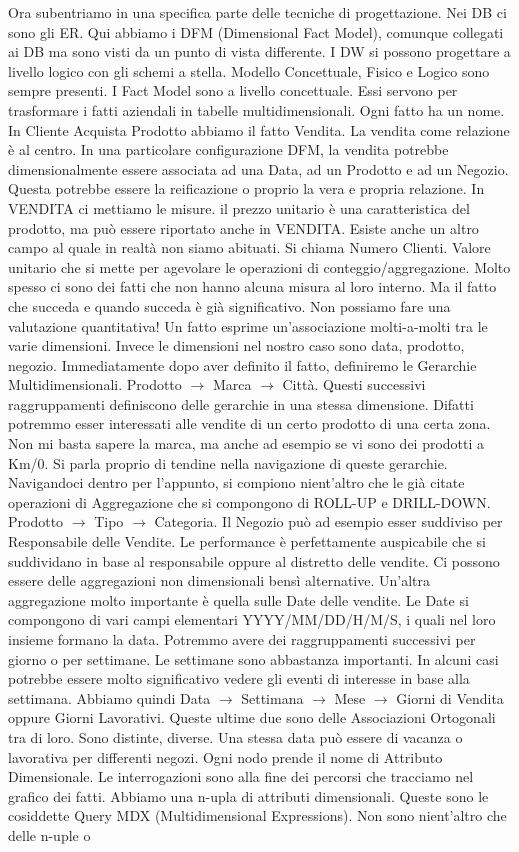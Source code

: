 Ora subentriamo in una specifica parte delle tecniche di progettazione. Nei DB ci sono gli ER. Qui abbiamo i DFM (Dimensional Fact Model), comunque collegati ai DB ma sono visti da un punto di vista differente. I DW si possono progettare a livello logico con gli schemi a stella. Modello Concettuale, Fisico e Logico sono sempre presenti. I Fact Model sono a livello concettuale. Essi servono per trasformare i fatti aziendali in tabelle multidimensionali. Ogni fatto ha un nome. In Cliente Acquista Prodotto abbiamo il fatto Vendita. La vendita come relazione è al centro. In una particolare configurazione DFM, la vendita potrebbe dimensionalmente essere associata ad una Data, ad un Prodotto e ad un Negozio. Questa potrebbe essere la reificazione o proprio la vera e propria relazione. In VENDITA ci mettiamo le misure. il prezzo unitario è una caratteristica del prodotto, ma può essere riportato anche in VENDITA. Esiste anche un altro campo al quale in realtà non siamo abituati. Si chiama Numero Clienti. Valore unitario che si mette per agevolare le operazioni di conteggio/aggregazione. Molto spesso ci sono dei fatti che non hanno alcuna misura al loro interno. Ma il fatto che succeda e quando succeda è già significativo. Non possiamo fare una valutazione quantitativa! Un fatto esprime un'associazione molti-a-molti tra le varie dimensioni. Invece le dimensioni nel nostro caso sono {{data}, {prodotto}, {negozio}}. Immediatamente dopo aver definito il fatto, definiremo le Gerarchie Multidimensionali. Prodotto $\rightarrow$ Marca $\rightarrow$ Città. Questi successivi raggruppamenti definiscono delle gerarchie in una stessa dimensione. Difatti potremmo esser interessati alle vendite di un certo prodotto di una certa zona. Non mi basta sapere la marca, ma anche ad esempio se vi sono dei prodotti a Km/0. Si parla proprio di tendine nella navigazione di queste gerarchie. Navigandoci dentro per l'appunto, si compiono nient'altro che le già citate operazioni di Aggregazione che si compongono di ROLL-UP e DRILL-DOWN. Prodotto $\rightarrow$ Tipo $\rightarrow$ Categoria. Il Negozio può ad esempio esser suddiviso per Responsabile delle Vendite. Le performance è perfettamente auspicabile che si suddividano in base al responsabile oppure al distretto delle vendite. Ci possono essere delle aggregazioni non dimensionali bensì alternative. Un'altra aggregazione molto importante è quella sulle Date delle vendite. Le Date si compongono di vari campi elementari YYYY/MM/DD/H/M/S, i quali nel loro insieme formano la data. Potremmo avere dei raggruppamenti successivi per giorno o per settimane. Le settimane sono abbastanza importanti. In alcuni casi potrebbe essere molto significativo vedere gli eventi di interesse in base alla settimana. Abbiamo quindi Data $\rightarrow$ Settimana $\rightarrow$ Mese $\rightarrow$ Giorni di Vendita oppure Giorni Lavorativi. Queste ultime due sono delle Associazioni Ortogonali tra di loro. Sono distinte, diverse. Una stessa data può essere di vacanza o lavorativa per differenti negozi. Ogni nodo prende il nome di Attributo Dimensionale. Le interrogazioni sono alla fine dei percorsi che tracciamo nel grafico dei fatti. Abbiamo una n-upla di attributi dimensionali. Queste sono le cosiddette Query MDX (Multidimensional Expressions). Non sono nient'altro che delle n-uple o 